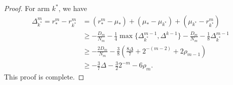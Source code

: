 \begin{proof}
    For arm $k^*$, we have
    \begin{equation*}
    \begin{split}
        \Delta_{k^*}^m =  r_*^m - r_{k^*}^m
        &= (r_*^m - \mu_*) + (\mu_* - \mu_{k^*}) + (\mu_{k^*} - r_{k^*}^m) \\
        &\geq -\frac{D_m}{N_m} - \frac{1}{4}\max \{\Delta_{k^*}^{m-1}, \Delta^{k-1}\} -\frac{D_m}{N_m} - \frac{1}{8}\Delta_{k^*}^{m-1} \\
        &\geq -\frac{2D_m}{N_m} - \frac{3}{8}(\frac{8\Delta}{7} + 2^{-(m-2)} + 2\rho_{m-1}) \\
        &\geq -\frac{3}{7}\Delta - \frac{3}{2}2^{-m} - 6\rho_m.
    \end{split}
    \end{equation*}
    This proof is complete.
\end{proof}

